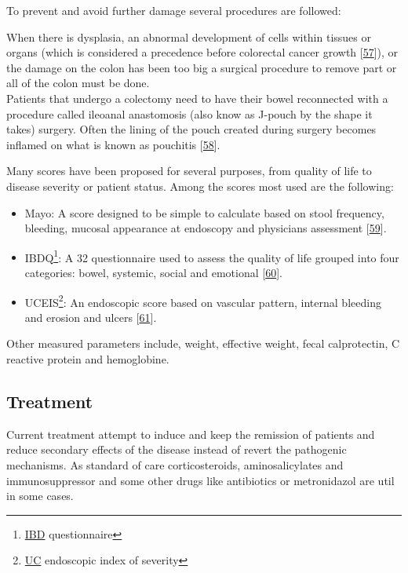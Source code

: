 \documentclass[
  12pt,
  a4paper,
  twoside,
  openright]{book}
\begin{document}
To prevent and avoid further damage several procedures are followed:

When there is dysplasia, an abnormal development of cells within tissues or organs (which is considered a precedence before colorectal cancer growth {[}\protect\hyperlink{ref-mark-christensen2018}{57}{]}), or the damage on the colon has been too big a surgical procedure to remove part or all of the colon must be done.\\
Patients that undergo a colectomy need to have their bowel reconnected with a procedure called ileoanal anastomosis (also know as J-pouch by the shape it takes) surgery.
Often the lining of the pouch created during surgery becomes inflamed on what is known as pouchitis {[}\protect\hyperlink{ref-schieffer2016}{58}{]}.

Many scores have been proposed for several purposes, from quality of life to disease severity or patient status.
Among the scores most used are the following:

\begin{itemize}
\item
  Mayo: A score designed to be simple to calculate based on stool frequency, bleeding, mucosal appearance at endoscopy and physicians assessment {[}\protect\hyperlink{ref-schroeder1987}{59}{]}.
\item
  IBDQ\footnote{\protect\hyperlink{acronyms_IBD}{IBD} questionnaire}: A 32 questionnaire used to assess the quality of life grouped into four categories: bowel, systemic, social and emotional {[}\protect\hyperlink{ref-irvine1999}{60}{]}.
\item
  UCEIS\footnote{\protect\hyperlink{acronyms_UC}{UC} endoscopic index of severity}: An endoscopic score based on vascular pattern, internal bleeding and erosion and ulcers {[}\protect\hyperlink{ref-travis2012}{61}{]}.
\end{itemize}

Other measured parameters include, weight, effective weight, fecal calprotectin, C reactive protein and hemoglobine.

\hypertarget{treatment}{%
\subsection{Treatment}\label{treatment}}

Current treatment attempt to induce and keep the remission of patients and reduce secondary effects of the disease instead of revert the pathogenic mechanisms.
As standard of care corticosteroids, aminosalicylates and immunosuppressor and some other drugs like antibiotics or metronidazol are util in some cases.
\end{document}

